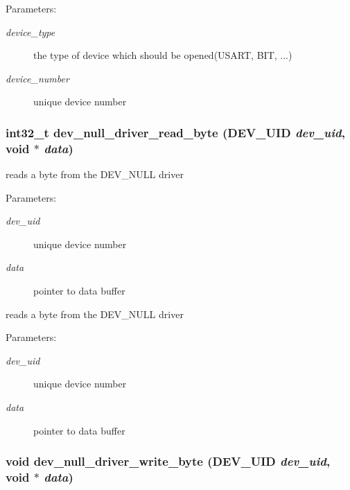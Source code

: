 \begin{Desc}
\item[Parameters:]
\begin{description}
\item[{\em device\_\-type}]the type of device which should be opened(USART, BIT, ...) \item[{\em device\_\-number}]unique device number \end{description}
\end{Desc}
\hypertarget{group___d_e_v___n_u_l_l___d_r_i_v_e_r_g2ddfdd67728b79b4672d1549f513dfc5}{
\subsubsection[{dev\_\-null\_\-driver\_\-read\_\-byte}]{\setlength{\rightskip}{0pt plus 5cm}int32\_\-t dev\_\-null\_\-driver\_\-read\_\-byte ({\bf DEV\_\-UID} {\em dev\_\-uid}, \/  void $\ast$ {\em data})}}
\label{group___d_e_v___n_u_l_l___d_r_i_v_e_r_g2ddfdd67728b79b4672d1549f513dfc5}


reads a byte from the DEV\_\-NULL driver 

\begin{Desc}
\item[Parameters:]
\begin{description}
\item[{\em dev\_\-uid}]unique device number \item[{\em data}]pointer to data buffer\end{description}
\end{Desc}
reads a byte from the DEV\_\-NULL driver

\begin{Desc}
\item[Parameters:]
\begin{description}
\item[{\em dev\_\-uid}]unique device number \item[{\em data}]pointer to data buffer \end{description}
\end{Desc}
\hypertarget{group___d_e_v___n_u_l_l___d_r_i_v_e_r_g37b6936dc7965e224e2c2977a905ed8f}{
\subsubsection[{dev\_\-null\_\-driver\_\-write\_\-byte}]{\setlength{\rightskip}{0pt plus 5cm}void dev\_\-null\_\-driver\_\-write\_\-byte ({\bf DEV\_\-UID} {\em dev\_\-uid}, \/  void $\ast$ {\em data})}}
\label{group___d_e_v___n_u_l_l___d_r_i_v_e_r_g37b6936dc7965e224e2c2977a905ed8f}


